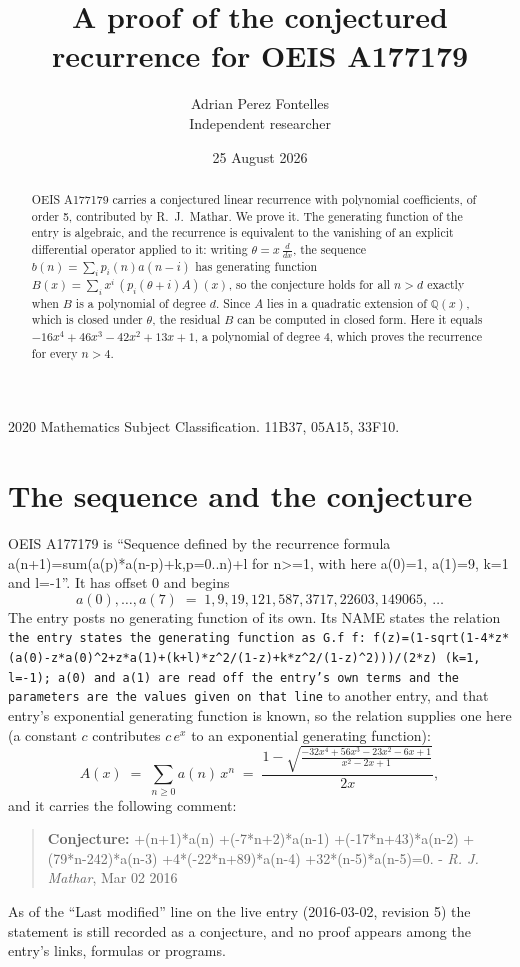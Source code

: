 \documentclass[11pt,a4paper]{article}
\title{A proof of the conjectured recurrence for OEIS A177179}
\author{Adrian Perez Fontelles\\ \small Independent researcher}
\date{25 August 2026}
\theoremstyle{plain}
\theoremstyle{definition}
\begin{document}
\maketitle

\begin{abstract}
OEIS A177179 carries a conjectured linear recurrence with polynomial coefficients, of
order 5, contributed by R.~J.~Mathar. We prove it. The generating function of the
entry is algebraic, and the recurrence is equivalent to the vanishing of an explicit
differential operator applied to it: writing $\theta=x\,\frac{d}{dx}$, the sequence
$b(n)=\sum_{i}p_{i}(n)a(n-i)$ has generating function
$B(x)=\sum_{i}x^{i}\,(p_{i}(\theta+i)A)(x)$, so the conjecture holds for all $n>d$ exactly
when $B$ is a polynomial of degree $d$. Since $A$ lies in a quadratic extension of
$\mathbb{Q}(x)$, which is closed under $\theta$, the residual $B$ can be computed in
closed form. Here it equals $- 16 x^{4} + 46 x^{3} - 42 x^{2} + 13 x + 1$, a polynomial of degree $4$, which proves
the recurrence for every $n>4$.
\end{abstract}

\noindent\small 2020 Mathematics Subject Classification. 11B37, 05A15, 33F10.\normalsize

\section{The sequence and the conjecture}

OEIS A177179 is ``Sequence defined by the recurrence formula a(n+1)=sum(a(p)*a(n-p)+k,p=0..n)+l for n>=1, with here a(0)=1, a(1)=9, k=1 and l=-1''. It has offset $0$ and begins
\[
a(0),\dots,a(7)\;=\;1, 9, 19, 121, 587, 3717, 22603, 149065,\ \dots
\]
The entry posts no generating function of its own. Its NAME states the
relation \texttt{the entry states the generating function as G.f f: f(z)=(1-sqrt(1-4*z*(a(0)-z*a(0)\textasciicircum{}2+z*a(1)+(k+l)*z\textasciicircum{}2/(1-z)+k*z\textasciicircum{}2/(1-z)\textasciicircum{}2)))/(2*z) (k=1, l=-1); a(0) and a(1) are read off the entry's own terms and the parameters are the values given on that line} to another entry, and that entry's exponential generating
function is known, so the relation supplies one here (a constant $c$ contributes
$c\,e^{x}$ to an exponential generating function):
\begin{equation}\label{eq:gf}
A(x)\;=\;\sum_{n\ge 0} a(n)\,x^{n}\;=\;\frac{1 - \sqrt{\frac{- 32 x^{4} + 56 x^{3} - 23 x^{2} - 6 x + 1}{x^{2} - 2 x + 1}}}{2 x} ,
\end{equation}
and it carries the following comment:
\begin{quote}\small
\textbf{Conjecture:} +(n+1)*a(n) +(-7*n+2)*a(n-1) +(-17*n+43)*a(n-2) +(79*n-242)*a(n-3) +4*(-22*n+89)*a(n-4) +32*(n-5)*a(n-5)=0. - \emph{R. J. Mathar}, Mar 02 2016
\end{quote}
As of the ``Last modified'' line on the live entry (2016-03-02, revision 5) the
statement is still recorded as a conjecture, and no proof appears among the entry's links,
formulas or programs.
\end{document}
